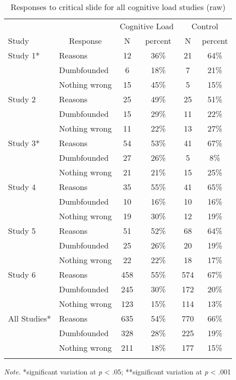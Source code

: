 \documentclass[
  american,
  man,floatsintext]{apa7}
\begin{document}
\begin{table}[tbp]

\begin{center}
\begin{threeparttable}

\caption{\label{tab:ch5taballraw}Responses to critical slide for all cognitive load studies (raw)}

\small{

\begin{tabular}{llcccc}
\toprule
 &  & \multicolumn{2}{c}{Cognitive Load} & \multicolumn{2}{c}{Control} \\
\cmidrule(r){3-4} \cmidrule(r){5-6}
Study & \multicolumn{1}{c}{Response} & \multicolumn{1}{c}{N} & \multicolumn{1}{c}{percent} & \multicolumn{1}{c}{N} & \multicolumn{1}{c}{percent}\\
\midrule
Study 1* & Reasons & 12 & 36\% & 21 & 64\%\\
 & Dumbfounded & 6 & 18\% & 7 & 21\%\\
 & Nothing wrong & 15 & 45\% & 5 & 15\%\\
Study 2 & Reasons & 25 & 49\% & 25 & 51\%\\
 & Dumbfounded & 15 & 29\% & 11 & 22\%\\
 & Nothing wrong & 11 & 22\% & 13 & 27\%\\
Study 3* & Reasons & 54 & 53\% & 41 & 67\%\\
 & Dumbfounded & 27 & 26\% & 5 & 8\%\\
 & Nothing wrong & 21 & 21\% & 15 & 25\%\\
Study 4 & Reasons & 35 & 55\% & 41 & 65\%\\
 & Dumbfounded & 10 & 16\% & 10 & 16\%\\
 & Nothing wrong & 19 & 30\% & 12 & 19\%\\
Study 5 & Reasons & 51 & 52\% & 68 & 64\%\\
 & Dumbfounded & 25 & 26\% & 20 & 19\%\\
 & Nothing wrong & 22 & 22\% & 18 & 17\%\\
Study 6 & Reasons & 458 & 55\% & 574 & 67\%\\
 & Dumbfounded & 245 & 30\% & 172 & 20\%\\
 & Nothing wrong & 123 & 15\% & 114 & 13\%\\
All Studies* & Reasons & 635 & 54\% & 770 & 66\%\\
 & Dumbfounded & 328 & 28\% & 225 & 19\%\\
 & Nothing wrong & 211 & 18\% & 177 & 15\%\\
\bottomrule
\addlinespace
\end{tabular}

}

\begin{tablenotes}[para]
\normalsize{\textit{Note.} *significant variation at \emph{p} < .05; **significant variation at \emph{p} < .001}
\end{tablenotes}

\end{threeparttable}
\end{center}

\end{table}
\end{document}
